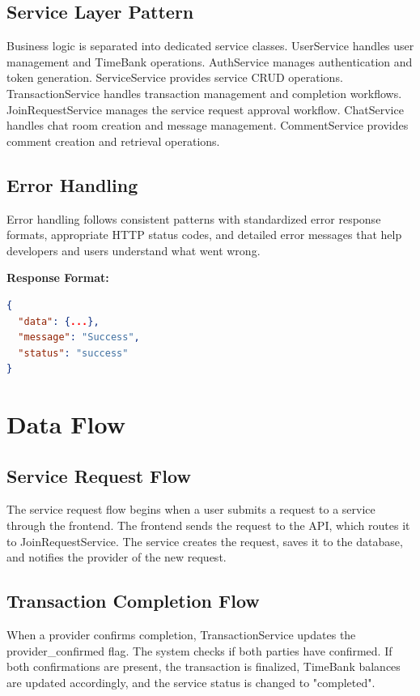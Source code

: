 \documentclass[12pt,a4paper]{report}
\begin{document}
\subsection{Service Layer Pattern}

Business logic is separated into dedicated service classes. UserService handles user management and TimeBank operations. AuthService manages authentication and token generation. ServiceService provides service CRUD operations. TransactionService handles transaction management and completion workflows. JoinRequestService manages the service request approval workflow. ChatService handles chat room creation and message management. CommentService provides comment creation and retrieval operations.

\subsection{Error Handling}

Error handling follows consistent patterns with standardized error response formats, appropriate HTTP status codes, and detailed error messages that help developers and users understand what went wrong.

\textbf{Response Format:}
\begin{lstlisting}[language=json]
{
  "data": {...},
  "message": "Success",
  "status": "success"
}
\end{lstlisting}

\section{Data Flow}

\subsection{Service Request Flow}

The service request flow begins when a user submits a request to a service through the frontend. The frontend sends the request to the API, which routes it to JoinRequestService. The service creates the request, saves it to the database, and notifies the provider of the new request.

\subsection{Transaction Completion Flow}

When a provider confirms completion, TransactionService updates the provider\_confirmed flag. The system checks if both parties have confirmed. If both confirmations are present, the transaction is finalized, TimeBank balances are updated accordingly, and the service status is changed to "completed".
\end{document}

